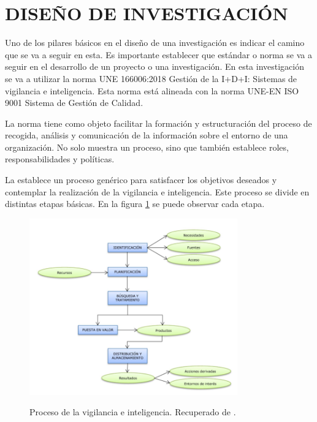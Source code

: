 \section{DISEÑO DE INVESTIGACIÓN}

Uno de los pilares básicos en el diseño de una investigación es indicar el camino que se va a seguir en esta. Es importante establecer que estándar o norma se va a seguir en el desarrollo de un proyecto o una investigación. En esta investigación se va a utilizar la norma UNE 166006:2018 Gestión de la I+D+I: Sistemas de vigilancia e inteligencia. Esta norma está alineada con la norma UNE-EN ISO 9001 Sistema de Gestión de Calidad. 

La norma  tiene como objeto facilitar la formación y estructuración del proceso de recogida, análisis y comunicación de la información sobre el entorno de una organización. No solo muestra un proceso, sino que también establece roles, responsabilidades y políticas.

La  establece un proceso genérico para satisfacer los objetivos deseados y contemplar la realización de la vigilancia e inteligencia. Este proceso se divide en distintas etapas básicas. En la figura \ref{fig:UNEsquema} se puede observar cada etapa.

\begin{figure}[h]
\centering
\caption{Proceso de la vigilancia e inteligencia. Recuperado de \protect{}.}
 \includegraphics[width=0.8\textwidth]{recursos/UNEEsquema}
\label{fig:UNEsquema}
\end{figure}


